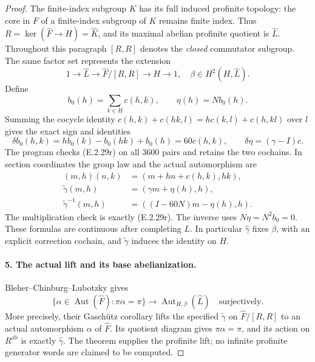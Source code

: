 \begin{proof}
The finite-index subgroup \(K\) has its full induced
profinite topology: the core in \(F\) of a finite-index
subgroup of \(K\) remains finite index. Thus
\(R=\ker(\widehat F\to H)=\widehat K\), and its maximal
abelian profinite quotient is \(\widehat L\).
Throughout this paragraph \([R,R]\) denotes the
\emph{closed} commutator subgroup. The same factor set
represents the extension
\[
 1\longrightarrow\widehat L\longrightarrow
 \widehat F/[R,R]\longrightarrow H\longrightarrow1,
 \quad \beta\in H^2(H,\widehat L).
 \tag{E.2.29p}
\]
Define
\[
 b_0(h)=\sum_{k\in H}c(h,k),\qquad \eta(h)=Nb_0(h).
 \tag{E.2.29q}
\]
Summing the cocycle identity
\(c(h,k)+c(hk,l)=h c(k,l)+c(h,kl)\) over \(l\)
gives the exact sign and identities
\[
 \delta b_0(h,k)=h b_0(k)-b_0(hk)+b_0(h)=60c(h,k),
 \qquad
 \delta\eta=(\gamma-I)c.
 \tag{E.2.29r}
\]
The program checks (E.2.29r) on all \(3600\) pairs
and retains the two cochains. In section coordinates
the group law and the actual automorphism are
\[
 \begin{aligned}
 (m,h)(n,k)&=(m+h n+c(h,k),hk),\\
 \widetilde\gamma(m,h)&=(\gamma m+\eta(h),h),\\
 \widetilde\gamma^{-1}(m,h)&=((I-60N)m-\eta(h),h).
 \end{aligned}
 \tag{E.2.29s}
\]
The multiplication check is exactly (E.2.29r).
The inverse uses \(N\eta=N^2b_0=0\).
These formulas are continuous after completing \(L\).
In particular \(\widehat\gamma\) fixes \(\beta\), with
an explicit correction cochain, and
\(\widetilde\gamma\) induces the identity on \(H\).

\paragraph{5. The actual lift and its base abelianization.}
Bleher--Chinburg--Lubotzky
\cite[Theorem~2.1, p.~4; Corollary~2.4 and its proof,
p.~5]{AuditBleherChinburgLubotzky2021v3}
gives
\[
 \{\alpha\in\operatorname{Aut}(\widehat F):\pi\alpha=\pi\}
 \longrightarrow
 \operatorname{Aut}_{H,\beta}(\widehat L)
 \quad\text{surjectively}.
 \tag{E.2.29t}
\]
More precisely, their Gaschütz corollary lifts the
specified \(\widetilde\gamma\) on
\(\widehat F/[R,R]\) to an actual automorphism
\(\alpha\) of \(\widehat F\). Its quotient diagram
gives \(\pi\alpha=\pi\), and its action on
\(R^{\mathrm{ab}}\) is exactly \(\widehat\gamma\).
The theorem supplies the profinite lift; no infinite
profinite generator words are claimed to be computed.


\end{proof}
